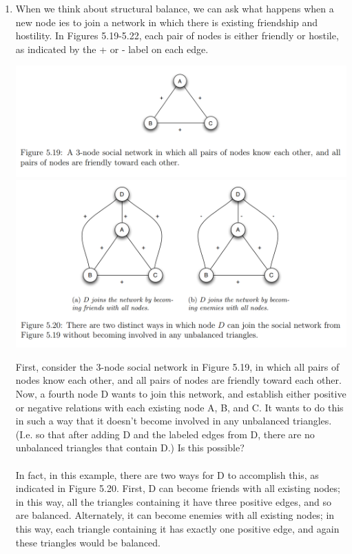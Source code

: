 \documentclass[11pt]{article}
\begin{document}
\begin{enumerate}
\item  

When we think about structural balance, we can ask what happens when a new node ies to join a network in which there is existing friendship and hostility. In Figures 5.19-5.22, each pair of nodes is either friendly or hostile, as indicated by the + or - label on each edge.\\
\begin{center}
	\includegraphics[scale=1]{Figure_5_19}\\
	\includegraphics[scale=1]{Figure_5_19-20}\\
\end{center}
First, consider the 3-node social network in Figure 5.19, in which all pairs of nodes know each other, and all pairs of nodes are friendly toward each other. Now, a fourth node D wants to join this network, and establish either positive or negative relations with each existing node A, B, and C. It wants to do this in such a way that it doesn’t become involved in any unbalanced triangles. (I.e. so that after adding D and the labeled edges from D, there are no unbalanced triangles that contain D.) Is this possible?\\\\
In fact, in this example, there are two ways for D to accomplish this, as indicated in Figure 5.20. First, D can become friends with all existing nodes; in this way, all the triangles containing it have three positive edges, and so are balanced. Alternately, it can become enemies with all existing nodes; in this way, each triangle containing it has exactly one positive edge, and again these triangles would be balanced.\\\\

\end{enumerate}
\end{document}
